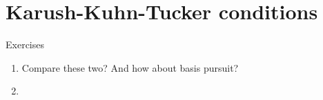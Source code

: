 \chapter{Karush-Kuhn-Tucker conditions}
\label{chap:kkt}


\begin{xcb}{Exercises}
\begin{enumerate}[label=\thechapter.\arabic*]
\settowidth{\leftmargini}{18.99.\hskip\labelsep}
\item \label{ex:lasso_dantzig}
Compare these two? And how about basis pursuit?

\item \label{ex:simplex_projection}

\end{enumerate}
\end{xcb}